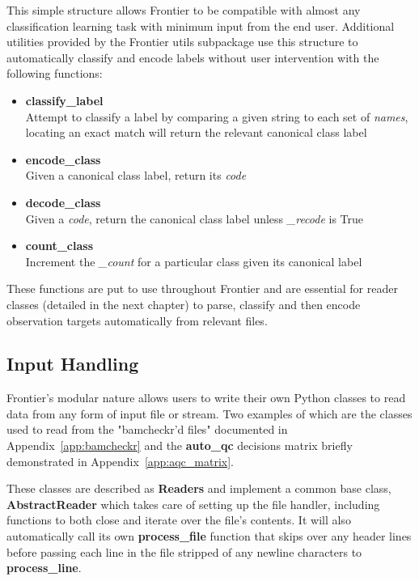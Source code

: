 This simple structure allows Frontier to be compatible with almost any
classification learning task with minimum input from the end user. Additional
utilities provided by the Frontier utils subpackage use this structure to
automatically classify and encode labels without user intervention with the
following functions:

\begin{itemize}
    \item \textbf{classify\_label} \hfill\\
        Attempt to classify a label by comparing a given string to each set of
        \textit{names}, locating an exact match will return the relevant
        canonical class label
    \item \textbf{encode\_class} \hfill\\
        Given a canonical class label, return its \textit{code}
    \item \textbf{decode\_class} \hfill\\
        Given a \textit{code}, return the canonical class label unless
        \textit{\_recode} is True
    \item \textbf{count\_class} \hfill\\
        Increment the \textit{\_count} for a particular class given its
        canonical label
\end{itemize}

These functions are put to use throughout Frontier and are essential for reader
classes (detailed in the next chapter) to parse, classify and then encode
observation targets automatically from relevant files.


\subsection{Input Handling}

Frontier's modular nature allows users to write their own Python classes to read
data from any form of input file or stream. Two examples of which are the
classes used to read from the "bamcheckr'd files" documented in
Appendix~\ref{app:bamcheckr} and the \textbf{auto\_qc} decisions matrix briefly
demonstrated in Appendix~\ref{app:aqc_matrix}.

These classes are described as \textbf{Readers} and implement a common base
class, \textbf{AbstractReader} which takes care of
setting up the file handler, including functions to both close and iterate over
the file's contents. It will also automatically call its own
\textbf{process\_file} function that skips over any header lines before passing
each line in the file stripped of any newline characters to \textbf{process\_line}.

